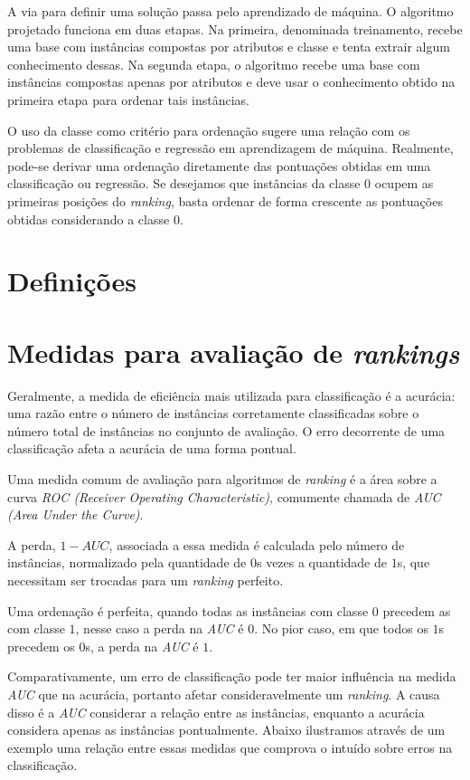 A via para definir uma solução passa pelo aprendizado de máquina. O algoritmo
projetado funciona em duas etapas. Na primeira, denominada treinamento, recebe
uma base com instâncias compostas por atributos e classe e tenta extrair algum
conhecimento dessas. Na segunda etapa, o algoritmo recebe uma base com
instâncias compostas apenas por atributos e deve usar o conhecimento obtido na
primeira etapa para ordenar tais instâncias.

O uso da classe como critério para ordenação sugere uma relação com os problemas
de classificação e regressão em aprendizagem de máquina. Realmente, pode-se
derivar uma ordenação diretamente das pontuações obtidas em uma classificação ou
regressão. Se desejamos que instâncias da classe $0$ ocupem as primeiras
posições do \emph{ranking}, basta ordenar de forma crescente as pontuações
obtidas considerando a classe $0$.

\section{Definições}

\section{Medidas para avaliação de \emph{rankings}}

Geralmente, a medida de eficiência mais utilizada para classificação é a
acurácia: uma razão entre o número de instâncias corretamente classificadas
sobre o número total de instâncias no conjunto de avaliação. O erro decorrente
de uma classificação afeta a acurácia de uma forma pontual.

Uma medida comum de avaliação para algoritmos de \emph{ranking} é a área sobre a
curva \emph{ROC (Receiver Operating Characteristic)}, comumente chamada de
\emph{AUC (Area Under the Curve)}.

A perda, $1 - AUC$, associada a essa medida é calculada pelo número de instâncias, normalizado pela quantidade de $0$s vezes a quantidade de $1$s, que necessitam ser trocadas para um \emph{ranking} perfeito.

Uma ordenação é perfeita, quando todas as instâncias com classe $0$ precedem as com classe $1$, nesse caso a perda na \emph{AUC} é $0$. No pior caso, em que todos os $1$s precedem os $0$s, a perda na \emph{AUC} é $1$.

Comparativamente, um erro de classificação pode ter maior influência na medida \emph{AUC} que na acurácia, portanto afetar consideravelmente um \emph{ranking}. A causa disso é a \emph{AUC} considerar a relação entre as instâncias, enquanto a acurácia considera apenas as instâncias pontualmente. Abaixo ilustramos através de um exemplo uma relação entre essas medidas que comprova o intuído sobre erros na classificação.

